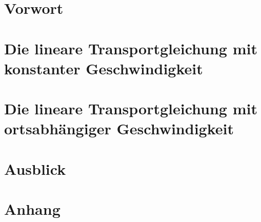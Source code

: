 \documentclass[a4paper
               ,12pt%
               ,10BCOM%
               ,openright%
               ,titlepage%
               ,twoside%
               ]{scrreprt}
\numberwithin{equation}{section}
\begin{document}

\pagestyle{empty}
\clearpage{}



\tableofcontents

\clearpage{}
\pagestyle{plain}
\setcounter{page}{1}

\chapter{Vorwort}

% 
\chapter{Die lineare Transportgleichung mit konstanter Geschwindigkeit}

\chapter{Die lineare Transportgleichung mit ortsabhängiger Geschwindigkeit}

\chapter{Ausblick}

% 



\appendix

\chapter{Anhang}



\end{document}
